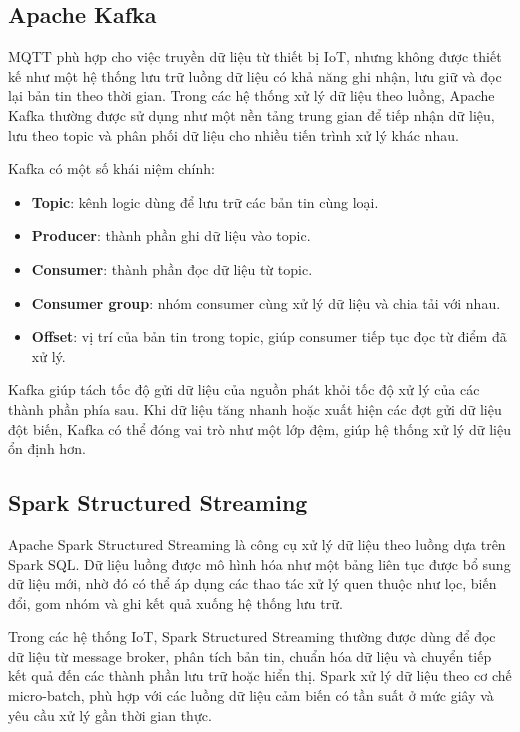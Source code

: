 \subsection{Apache Kafka}

MQTT phù hợp cho việc truyền dữ liệu từ thiết bị IoT, nhưng không được thiết kế như một hệ thống lưu trữ luồng dữ liệu có khả năng ghi nhận, lưu giữ và đọc lại bản tin theo thời gian. Trong các hệ thống xử lý dữ liệu theo luồng, Apache Kafka thường được sử dụng như một nền tảng trung gian để tiếp nhận dữ liệu, lưu theo topic và phân phối dữ liệu cho nhiều tiến trình xử lý khác nhau.


Kafka có một số khái niệm chính:

\begin{itemize}
  \item \textbf{Topic}: kênh logic dùng để lưu trữ các bản tin cùng loại.
  \item \textbf{Producer}: thành phần ghi dữ liệu vào topic.
  \item \textbf{Consumer}: thành phần đọc dữ liệu từ topic.
  \item \textbf{Consumer group}: nhóm consumer cùng xử lý dữ liệu và chia tải với nhau.
  \item \textbf{Offset}: vị trí của bản tin trong topic, giúp consumer tiếp tục đọc từ điểm đã xử lý.
\end{itemize}

Kafka giúp tách tốc độ gửi dữ liệu của nguồn phát khỏi tốc độ xử lý của các thành phần phía sau. Khi dữ liệu tăng nhanh hoặc xuất hiện các đợt gửi dữ liệu đột biến, Kafka có thể đóng vai trò như một lớp đệm, giúp hệ thống xử lý dữ liệu ổn định hơn.

\subsection{Spark Structured Streaming}


Apache Spark Structured Streaming là công cụ xử lý dữ liệu theo luồng dựa trên Spark SQL. Dữ liệu luồng được mô hình hóa như một bảng liên tục được bổ sung dữ liệu mới, nhờ đó có thể áp dụng các thao tác xử lý quen thuộc như lọc, biến đổi, gom nhóm và ghi kết quả xuống hệ thống lưu trữ.

Trong các hệ thống IoT, Spark Structured Streaming thường được dùng để đọc dữ liệu từ message broker, phân tích bản tin, chuẩn hóa dữ liệu và chuyển tiếp kết quả đến các thành phần lưu trữ hoặc hiển thị. Spark xử lý dữ liệu theo cơ chế micro-batch, phù hợp với các luồng dữ liệu cảm biến có tần suất ở mức giây và yêu cầu xử lý gần thời gian thực.

